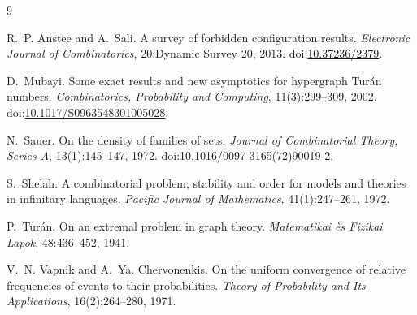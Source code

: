 \documentclass[11pt]{article}
\theoremstyle{definition}
\begin{document}
	\begin{thebibliography}{9}
		
		R.~P. Anstee and A.~Sali.
		A survey of forbidden configuration results.
		\emph{Electronic Journal of Combinatorics}, 20:Dynamic Survey 20, 2013.
		\newblock doi:\href{https://doi.org/10.37236/2379}{10.37236/2379}.
		
		D.~Mubayi.
		Some exact results and new asymptotics for hypergraph Tur\'an numbers.
		\emph{Combinatorics, Probability and Computing}, 11(3):299--309, 2002.
		\newblock doi:\href{https://doi.org/10.1017/S0963548301005028}{10.1017/S0963548301005028}.
		
		N.~Sauer.
		On the density of families of sets.
		\emph{Journal of Combinatorial Theory, Series A}, 13(1):145--147, 1972.
		\newblock doi:10.1016/0097-3165(72)90019-2.
		
		S.~Shelah.
		A combinatorial problem; stability and order for models and theories in
		infinitary languages.
		\emph{Pacific Journal of Mathematics}, 41(1):247--261, 1972.
		
		P.~Tur\'an.
		On an extremal problem in graph theory.
		\emph{Matematikai \`es Fizikai Lapok}, 48:436--452, 1941.
		
		V.~N. Vapnik and A.~Ya. Chervonenkis.
		On the uniform convergence of relative frequencies of events to their
		probabilities.
		\emph{Theory of Probability and Its Applications}, 16(2):264--280, 1971.
		
	\end{thebibliography}
	
\end{document}
